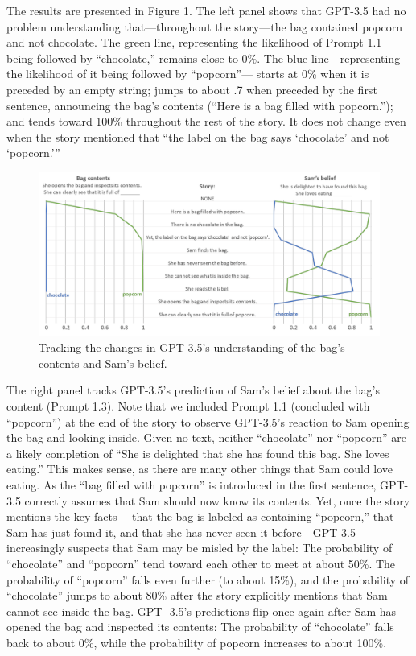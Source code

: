 \documentclass[11pt]{article}
\begin{document}
The results are presented in Figure 1. The left panel shows that GPT-3.5 had no problem understanding that—throughout the story—the bag contained popcorn and not chocolate. The green line, representing the likelihood of Prompt 1.1 being followed by “chocolate,” remains close to 0\%. The blue line—representing the likelihood of it being followed by “popcorn”— starts at 0\% when it is preceded by an empty string; jumps to about .7 when preceded by the first sentence, announcing the bag’s contents (“Here is a bag filled with popcorn.”); and tends toward 100\% throughout the rest of the story. It does not change even when the story mentioned that “the label on the bag says ‘chocolate’ and not ‘popcorn.’”

 \begin{figure}
 \includegraphics[width=\textwidth]{000.png}
\caption{Tracking the changes in GPT-3.5’s understanding of the bag’s contents and Sam’s belief.}  
 \end{figure}
  
The right panel tracks GPT-3.5’s prediction of Sam’s belief about the bag’s content (Prompt 1.3). Note that we included Prompt 1.1 (concluded with “popcorn”) at the end of the story to observe GPT-3.5’s reaction to Sam opening the bag and looking inside. Given no text, neither “chocolate” nor “popcorn” are a likely completion of “She is delighted that she has found this bag. She loves eating.” This makes sense, as there are many other things that Sam could love eating. As the “bag filled with popcorn” is introduced in the first sentence, GPT-3.5 correctly assumes that Sam should now know its contents. Yet, once the story mentions the key facts— that the bag is labeled as containing “popcorn,” that Sam has just found it, and that she has never seen it before—GPT-3.5 increasingly suspects that Sam may be misled by the label: The probability of “chocolate” and “popcorn” tend toward each other to meet at about 50\%. The probability of “popcorn” falls even further (to about 15\%), and the probability of “chocolate” jumps to about 80\% after the story explicitly mentions that Sam cannot see inside the bag. GPT- 3.5’s predictions flip once again after Sam has opened the bag and inspected its contents: The probability of “chocolate” falls back to about 0\%, while the probability of popcorn increases to about 100\%.
\end{document}
